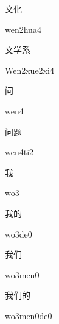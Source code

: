 \begin{multicols*}{2}
\begin{verbete}{文化}
\begin{pronuncia}{wen2hua4}
\end{pronuncia}
\end{verbete}

\begin{verbete}{文学系}
\begin{pronuncia}{Wen2xue2xi4}
\end{pronuncia}
\end{verbete}

\begin{verbete}[wen4]{问}
\begin{pronuncia}{wen4}
\end{pronuncia}
\end{verbete}

\begin{verbete}[wen4ti2]{问题}
\begin{pronuncia}{wen4ti2}
\end{pronuncia}
\end{verbete}

\begin{verbete}[wo3]{我}
\begin{pronuncia}{wo3}
\end{pronuncia}
\end{verbete}

\begin{verbete}[wo3de0]{我的}
\begin{pronuncia}{wo3de0}
\end{pronuncia}
\end{verbete}

\begin{verbete}[wo3men0]{我们}
\begin{pronuncia}{wo3men0}
\end{pronuncia}
\end{verbete}

\begin{verbete}[wo3men0de0]{我们的}
\begin{pronuncia}{wo3men0de0}
\end{pronuncia}
\end{verbete}


\end{multicols*}
